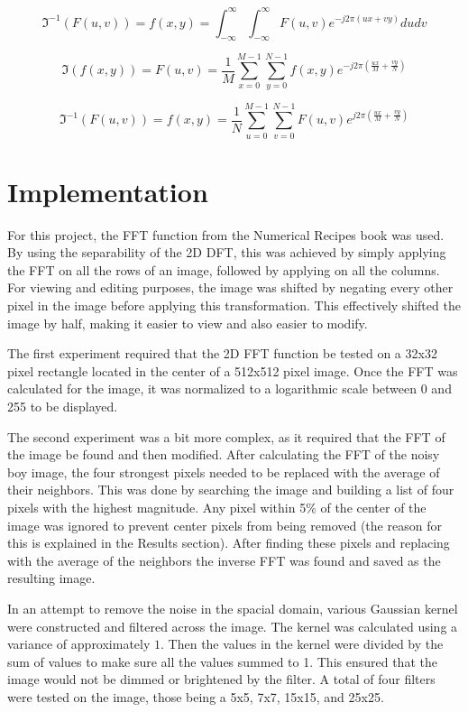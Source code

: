 \begin{equation}
  \label{eq:ift}
  \Im^{-1}(F(u,v))=f(x,y)=\int_{-\infty}^{\infty} \int_{-\infty}^{\infty} F(u,v)e^{-j2\pi(ux+vy)} du dv
\end{equation}

\begin{equation}
  \label{eq:dft}
  \Im(f(x,y))=F(u,v)=\frac{1}{M} \sum_{x=0}^{M-1} \sum_{y=0}^{N-1} f(x,y) e^{-j2 \pi ( \frac{ux}{M} + \frac{vy}{N} )}
\end{equation}

\begin{equation}
  \label{eq:idft}
  \Im^{-1}(F(u,v))=f(x,y)=\frac{1}{N} \sum_{u=0}^{M-1} \sum_{v=0}^{N-1} F(u,v) e^{j2 \pi ( \frac{ux}{M} + \frac{vy}{N} )}
\end{equation}

\section{Implementation}
  For this project, the FFT function from the Numerical Recipes book was used.  By using the separability of the 2D DFT,
this was achieved by simply applying the FFT on all the rows of an image, followed by applying on all the columns.  For
viewing and editing purposes, the image was shifted by negating every other pixel in the image before applying this transformation.
This effectively shifted the image by half, making it easier to view and also easier to modify.

  The first experiment required that the 2D FFT function be tested on a 32x32 pixel rectangle located in the center of a 512x512 pixel
image.  Once the FFT was calculated for the image, it was normalized to a logarithmic scale between 0 and 255 to be displayed.

  The second experiment was a bit more complex, as it required that the FFT of the image be found and then modified.  After calculating
the FFT of the noisy boy image, the four strongest pixels needed to be replaced with the average of their neighbors.  This was done by
searching the image and building a list of four pixels with the highest magnitude.  Any pixel within 5\% of the center of the image was
ignored to prevent center pixels from being removed (the reason for this is explained in the Results section).  After finding these pixels
and replacing with the average of the neighbors the inverse FFT was found and saved as the resulting image.

  In an attempt to remove the noise in the spacial domain, various Gaussian kernel were constructed and filtered across the image.  The
kernel was calculated using a variance of approximately $1$.  Then the values in the kernel were divided by the sum of values to make
sure all the values summed to 1.  This ensured that the image would not be dimmed or brightened by the filter.  A total of four filters
were tested on the image, those being a 5x5, 7x7, 15x15, and 25x25.

